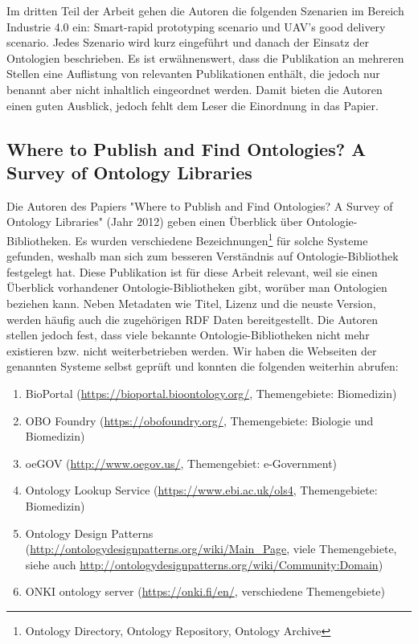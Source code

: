 \documentclass{article}
\begin{document}
Im dritten Teil der Arbeit gehen die Autoren die folgenden Szenarien im Bereich Industrie 4.0 ein: Smart-rapid prototyping scenario und UAV’s good delivery scenario.
Jedes Szenario wird kurz eingeführt und danach der Einsatz der Ontologien beschrieben.
Es ist erwähnenswert, dass die Publikation an mehreren Stellen eine Auflistung von relevanten Publikationen enthält, die jedoch nur benannt aber nicht inhaltlich eingeordnet werden. Damit bieten die Autoren einen guten Ausblick, jedoch fehlt dem Leser die Einordnung in das Papier.


\subsection{Where to Publish and Find Ontologies? A Survey of Ontology Libraries}

Die Autoren des Papiers "Where to Publish and Find Ontologies? A Survey of Ontology Libraries" \cite{d2012publish} (Jahr 2012) geben einen Überblick über Ontologie-Bibliotheken.
Es wurden verschiedene Bezeichnungen\footnote{Ontology Directory, Ontology Repository, Ontology Archive} für solche Systeme gefunden, weshalb man sich zum besseren Verständnis auf Ontologie-Bibliothek festgelegt hat.
Diese Publikation ist für diese Arbeit relevant, weil sie einen Überblick vorhandener Ontologie-Bibliotheken gibt, worüber man Ontologien beziehen kann.
Neben Metadaten wie Titel, Lizenz und die neuste Version, werden häufig auch die zugehörigen RDF Daten bereitgestellt.
Die Autoren stellen jedoch fest, dass viele bekannte Ontologie-Bibliotheken nicht mehr existieren bzw. nicht weiterbetrieben werden.
Wir haben die Webseiten der genannten Systeme selbst geprüft und konnten die folgenden weiterhin abrufen:

\begin{enumerate}
    \item BioPortal (\url{https://bioportal.bioontology.org/}, Themengebiete: Biomedizin)
    \item OBO Foundry (\url{https://obofoundry.org/}, Themengebiete: Biologie und Biomedizin)
    \item oeGOV (\url{http://www.oegov.us/}, Themengebiet: e-Government)
    \item Ontology Lookup Service (\url{https://www.ebi.ac.uk/ols4}, Themengebiete: Biomedizin)
    \item Ontology Design Patterns (\url{http://ontologydesignpatterns.org/wiki/Main\_Page}, viele Themengebiete, siehe auch \url{http://ontologydesignpatterns.org/wiki/Community:Domain})
    \item ONKI ontology server (\url{https://onki.fi/en/}, verschiedene Themengebiete)
\end{enumerate}
\end{document}

